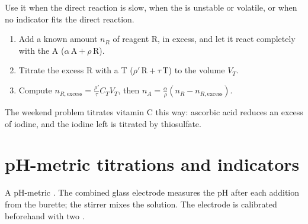 \begin{method}\label{met:b1:titration-methods:back-titration}
Use it when the direct reaction is slow, when the  is unstable or
volatile, or when no indicator fits the direct reaction.
\begin{enumerate}
  \item Add a known amount $n_R$ of reagent R, in excess, and let it react
        completely with the  A ($\alpha\,\mathrm{A} + \rho\,\mathrm{R}$).
  \item Titrate the excess R with a  T ($\rho'\,\mathrm{R} +
        \tau\,\mathrm{T}$) to the  volume $V_T$.
  \item Compute $n_{R,\text{excess}} = \frac{\rho'}{\tau}C_TV_T$, then
        $n_A = \frac{\alpha}{\rho}(n_R - n_{R,\text{excess}})$.
\end{enumerate}
\end{method}

The weekend problem titrates vitamin C this way: ascorbic acid reduces
an excess of iodine, and the iodine left is titrated by thiosulfate.

\section{pH-metric titrations and indicators}

\begin{omfigure}

{\small A pH-metric . The combined glass electrode measures the
pH after each addition from the burette; the stirrer mixes the solution.
The electrode is calibrated beforehand with two .}
\end{omfigure}

